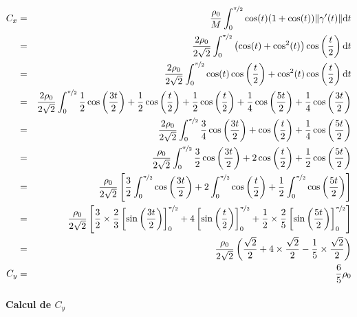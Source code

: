 \documentclass[a4paper, 11pt]{report} %
\newcommand{\dt}{\mathrm{d}t}
\begin{document}
\begin{eqnarray*}
C_x & = & \frac{\rho_0}{M}\int_0^{\nicefrac{\pi}{2}}\cos(t)(1+\cos(t))\lVert\gamma'(t)\rVert\dt\\
    & = & \frac{2\rho_0}{2\sqrt{2}}\int_0^{\nicefrac{\pi}{2}}\left(\cos(t)+\cos^2(t)\right)\cos\left(\frac{t}{2}\right)\dt\\
    & = & \frac{2\rho_0}{2\sqrt{2}}\int_0^{\nicefrac{\pi}{2}}\cos(t)\cos\left(\frac{t}{2}\right)+\cos^2(t)\cos\left(\frac{t}{2}\right)\dt\\
    & = & \frac{2\rho_0}{2\sqrt{2}}\int_0^{\nicefrac{\pi}{2}}
        \frac{1}{2}\cos\left(\frac{3t}{2}\right)+\frac{1}{2}\cos\left(\frac{t}{2}\right)+
        \frac{1}{2}\cos\left(\frac{t}{2}\right) + \frac{1}{4}\cos\left(\frac{5t}{2}\right)+\frac{1}{4}\cos\left(\frac{3t}{2}\right)\\
    & = & \frac{2\rho_0}{2\sqrt{2}}\int_0^{\nicefrac{\pi}{2}}
        \frac{3}{4}\cos\left(\frac{3t}{2}\right)+\cos\left(\frac{t}{2}\right)+ \frac{1}{4}\cos\left(\frac{5t}{2}\right)\\
    & = & \frac{\rho_0}{2\sqrt{2}}\int_0^{\nicefrac{\pi}{2}}
        \frac{3}{2}\cos\left(\frac{3t}{2}\right)+2\cos\left(\frac{t}{2}\right)+ \frac{1}{2}\cos\left(\frac{5t}{2}\right)\\
    & = & \frac{\rho_0}{2\sqrt{2}}\left[
            \frac{3}{2}\int_0^{\nicefrac{\pi}{2}}\cos\left(\frac{3t}{2}\right)+
            2\int_0^{\nicefrac{\pi}{2}}\cos\left(\frac{t}{2}\right)+
            \frac{1}{2}\int_0^{\nicefrac{\pi}{2}}\cos\left(\frac{5t}{2}\right)
        \right]\\
    & = & \frac{\rho_0}{2\sqrt{2}}\left[
        \frac{3}{2}\times\frac{2}{3}\left[\sin\left(\frac{3t}{2}\right)\right]_0^{\nicefrac{\pi}{2}}+
        4\left[\sin\left(\frac{t}{2}\right)\right]_0^{\nicefrac{\pi}{2}}+
        \frac{1}{2}\times\frac{2}{5}\left[\sin\left(\frac{5t}{2}\right)\right]_0^{\nicefrac{\pi}{2}}
        \right]\\
    & = & \frac{\rho_0}{2\sqrt{2}}\left(
        \frac{\sqrt{2}}{2}+
        4\times\frac{\sqrt{2}}{2}-
        \frac{1}{5}\times\frac{\sqrt{2}}{2}
        \right)\\
    C_y & = & \frac{6}{5}\rho_0
\end{eqnarray*}


\paragraph{Calcul de $C_y$} %
\end{document}
